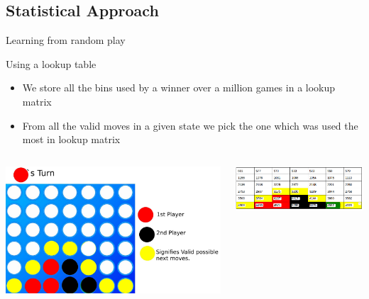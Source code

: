 \documentclass[aspectratio=169]{beamer}
\begin{document}
\subsection{Statistical Approach} 
\begin{frame}{Learning from random play}

\begin{block}{Using a lookup table}


\begin{itemize}
 \item We store all the bins used by a winner over a million games in a lookup matrix
 \item From all the valid moves in a given state we pick the one which was used the most in lookup matrix 

\end{itemize}

\end{block}
    \begin{columns}
	 	\begin{column}{0.4\textwidth}
			
			\includegraphics[scale = .1005]{valid.jpeg}
	 	\end{column}
 		\begin{column}{0.5\textwidth}
			
			\includegraphics[scale = 0.45]{table.png}	
	 	\end{column}
	 \end{columns}
\end{frame}
\end{document}
